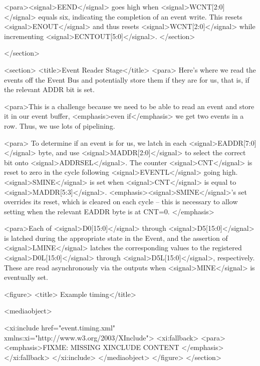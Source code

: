         <para><signal>EEND</signal> goes high when
        <signal>WCNT[2:0]</signal> equals six, indicating the
        completion of an event write. This resets
        <signal>ENOUT</signal> and thus resets
        <signal>WCNT[2:0]</signal> while incrementing
        <signal>ECNTOUT[5:0]</signal>. 
      </section>
    
    </section>

    <section>
      <title>Event Reader Stage</title>
      <para> Here's where we read the events off the Event Bus and
      potentially store them if they are for us, that is, if the
      relevant ADDR bit is set.  
      
      <para>This is a challenge because we need to be able to read an
      event and store it in our event buffer, <emphasis>even
      if</emphasis> we get two events in a row. Thus, we use lots of
      pipelining. 

      <para> To determine if an event is for us, we latch in each
      <signal>EADDR[7:0]</signal> byte, and use
      <signal>MADDR[2:0]</signal> to select the correct bit onto
      <signal>ADDRSEL</signal>. The counter <signal>CNT</signal> is
      reset to zero in the cycle following <signal>EVENTL</signal>
      going high. <signal>SMINE</signal> is set when
      <signal>CNT</signal> is equal to
      <signal>MADDR[5:3]</signal>. <emphasis><signal>SMINE</signal>'s
      set overrides its reset, which is cleared on each cycle -- this
      is necessary to allow setting when the relevant EADDR byte is at
      CNT=0. </emphasis>

      <para>Each of <signal>D0[15:0]</signal> through
      <signal>D5[15:0]</signal> is latched during the appropriate
      state in the Event, and the assertion of <signal>LMINE</signal>
      latches the corresponding values to the registered
      <signal>D0L[15:0]</signal> through <signal>D5L[15:0]</signal>,
      respectively. These are read asynchronously via the outputs when
      <signal>MINE</signal> is eventually set. 

      <figure>
        <title> Example timing</title>
        
        <mediaobject>

          <xi:include  href="event.timing.xml" 
                       xmlns:xi="http://www.w3.org/2003/XInclude">
            <xi:fallback>
              <para><emphasis>FIXME:  MISSING XINCLUDE CONTENT
              </emphasis>
            </xi:fallback>
          </xi:include>
        </mediaobject>
      </figure>
    </section> 

